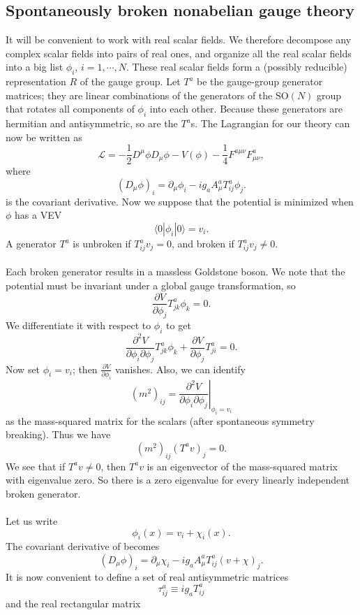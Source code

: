 \subsection{Spontaneously broken nonabelian gauge theory}
It will be convenient to work with real scalar fields. We
therefore decompose any complex scalar fields into pairs of real ones, and organize all the real scalar fields into a big list $\phi_i$, $i = 1,\cdots,N$. 
These real scalar fields form a (possibly reducible) representation $R$ of the gauge group. Let $T^a$ be the gauge-group generator matrices; they are linear combinations of the generators of the $\mathrm{SO}(N)$ group that rotates all components of $\phi_i$ into each other. Because these generators are hermitian and antisymmetric, so are the  $T^a$s. The Lagrangian for our theory can now be written as
\[\mathcal{L} = -\frac{1}{2}D^{\mu}\phi D_{\mu}\phi - V(\phi) - \frac{1}{4}F^{a\mu\nu}F^a_{\mu\nu},\]
where
\[(D_{\mu}\phi)_i = \partial_{\mu}\phi_i - ig_aA^a_{\mu}T^a_{ij}\phi_j.\]
is the covariant derivative.
Now we suppose that the potential is minimized when $\phi$ has a VEV
\[\langle 0 | \phi_i | 0 \rangle = v_i.\]
A generator $T^a$ is unbroken if $T^a_{ij}v_j = 0$, and broken if $T^a_{ij}v_j \neq 0$.
\\ \\
Each broken generator results in a massless Goldstone boson. We note that the potential must be invariant under a global gauge transformation, so
\[\frac{\partial V}{\partial \phi_j} T^a_{jk}\phi_k = 0.\]
We differentiate it with respect to $\phi_i$ to get
\[\frac{\partial^2 V}{\partial \phi_i \partial \phi_j} T^a_{jk}\phi_k + \frac{\partial V}{\partial \phi_j} T^a_{ji} = 0 .\]
Now set $\phi_i = v_i$; then $\frac{\partial V}{\partial \phi_i}$ vanishes. Also, we can identify
\[(m^2)_{ij} = \left. \frac{\partial^2 V}{\partial \phi_i \partial \phi_j} \right|_{\phi_i = v_i}\]
as the mass-squared matrix for the scalars (after spontaneous symmetry breaking). Thus we have
\[(m^2)_{ij} (T^av)_j = 0.\]
We see that if $T^av \neq 0$, then $T^av$ is an eigenvector of the mass-squared matrix with eigenvalue zero. So there is a zero eigenvalue for every linearly independent broken generator.
\\ \\
Let us write
\[\phi_i(x) = v_i + \chi_i(x).\]
The covariant derivative of becomes
\[(D_{\mu}\phi)_i = \partial_{\mu}\chi_i - ig_aA^a_{\mu}T^a_{ij}(v+\chi)_j.\]
It is now convenient to define a set of real antisymmetric matrices
\[\tau^a_{ij} \equiv ig_aT^a_{ij}\]
and the real rectangular matrix
